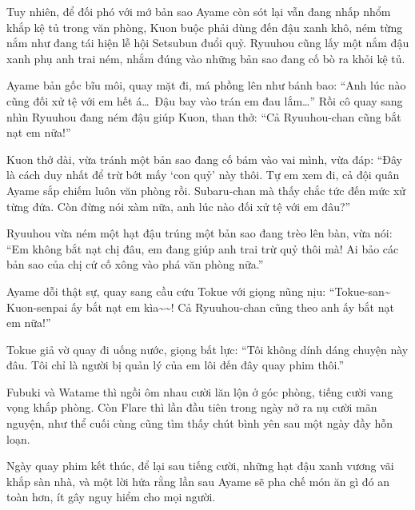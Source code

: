 \documentclass[../main.tex]{subfiles}
\begin{document}
Tuy nhiên, để đối phó với mớ bản sao Ayame còn sót lại vẫn đang nhấp nhổm khắp kệ tủ trong văn phòng, Kuon buộc phải dùng đến đậu xanh khô, ném từng nắm như đang tái hiện lễ hội Setsubun đuổi quỷ. Ryuuhou cũng lấy một nắm đậu xanh phụ anh trai ném, nhắm đúng vào những bản sao đang cố bò ra khỏi kệ tủ.

Ayame bản gốc bĩu môi, quay mặt đi, má phồng lên như bánh bao: ``Anh lúc nào cũng đối xử tệ với em hết á\dots\ Đậu bay vào trán em đau lắm\dots'' Rồi cô quay sang nhìn Ryuuhou đang ném đậu giúp Kuon, than thở: ``Cả Ryuuhou-chan cũng bắt nạt em nữa!''

Kuon thở dài, vừa tránh một bản sao đang cố bám vào vai mình, vừa đáp: ``Đây là cách duy nhất để trừ bớt mấy `con quỷ' này thôi. Tự em xem đi, cả đội quân Ayame sắp chiếm luôn văn phòng rồi. Subaru-chan mà thấy chắc tức đến mức xử từng đứa. Còn đừng nói xàm nữa, anh lúc nào đối xử tệ với em đâu?''

Ryuuhou vừa ném một hạt đậu trúng một bản sao đang trèo lên bàn, vừa nói: ``Em không bắt nạt chị đâu, em đang giúp anh trai trừ quỷ thôi mà! Ai bảo các bản sao của chị cứ cố xông vào phá văn phòng nữa.''

Ayame dỗi thật sự, quay sang cầu cứu Tokue với giọng nũng nịu: ``Tokue-san\~{} Kuon-senpai ấy bắt nạt em kìa\~{}\~{}! Cả Ryuuhou-chan cũng theo anh ấy bắt nạt em nữa!''

Tokue giả vờ quay đi uống nước, giọng bất lực: ``Tôi không dính dáng chuyện này đâu. Tôi chỉ là người bị quản lý của em lôi đến đây quay phim thôi.''

Fubuki và Watame thì ngồi ôm nhau cười lăn lộn ở góc phòng, tiếng cười vang vọng khắp phòng. Còn Flare thì lần đầu tiên trong ngày nở ra nụ cười mãn nguyện, như thể cuối cùng cũng tìm thấy chút bình yên sau một ngày đầy hỗn loạn.

Ngày quay phim kết thúc, để lại sau tiếng cười, những hạt đậu xanh vương vãi khắp sàn nhà, và một lời hứa rằng lần sau Ayame sẽ pha chế món ăn gì đó an toàn hơn, ít gây nguy hiểm cho mọi người.
\end{document}
